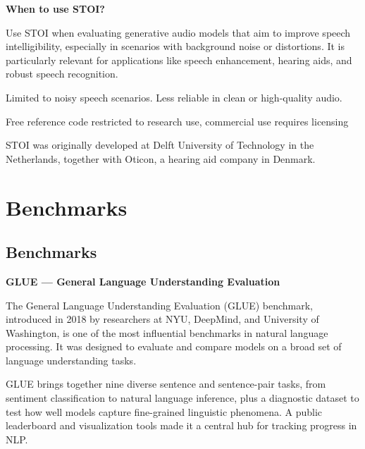 \textbf{When to use STOI?}

Use STOI when evaluating generative audio models that aim to improve speech intelligibility, especially in scenarios with background noise
or distortions. It is particularly relevant for applications like speech enhancement, hearing aids, and robust speech recognition.

{
\item Limited to noisy speech scenarios. Less reliable in clean or high-quality audio.
\item Free reference code restricted to research use, commercial use requires licensing
}

\clearpage

\thispagestyle{customstyle}

{STOI was originally developed at Delft University of Technology in the Netherlands, together with Oticon, a hearing aid company in Denmark.}


\clearpage
\thispagestyle{genaistyle}
\section{Benchmarks}
\subsection{Benchmarks}

\textbf{GLUE — General Language Understanding Evaluation}

The General Language Understanding Evaluation (GLUE) benchmark, introduced in 2018 by researchers at NYU, DeepMind, and University of Washington,
is one of the most influential benchmarks in natural language processing. It was designed to evaluate and compare models on a broad set
of language understanding tasks.

GLUE brings together nine diverse sentence and sentence-pair tasks, from sentiment classification to natural language inference, plus a diagnostic
dataset to test how well models capture fine-grained linguistic phenomena. A public leaderboard and visualization tools made it a central hub for
tracking progress in NLP.

